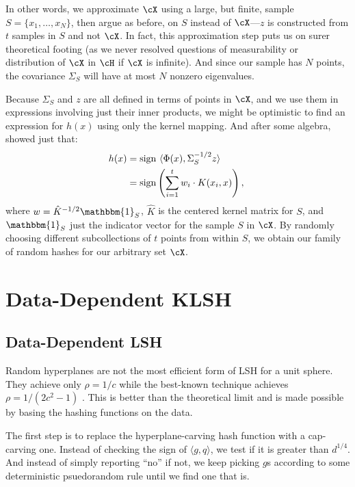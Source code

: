 \documentclass[twoside,11pt]{homework}
\begin{document}
\begin{multicols}{2}
In other words, we approximate $\cX$ using a large, but finite, sample $S = \{x_1,\dotsc, x_N\}$, then argue as before, on $S$ instead of $\cX$---$z$ is constructed from $t$ samples in $S$ and not $\cX$. In fact, this approximation step puts us on surer theoretical footing (as we never resolved questions of measurability or distribution of $\cX$ in $\cH$ if $\cX$ is infinite). And since our sample has $N$ points, the covariance $\Sigma_S$ will have at most $N$ nonzero eigenvalues.

Because $\Sigma_S$ and $z$ are all defined in terms of points in $\cX$, and we use them in expressions involving just their inner products, we might be optimistic to find an expression for $h(x)$ using only the kernel mapping. And after some algebra, \cite{K2012} showed just that:
\begin{align}
  h(x) &= \operatorname{sign} \ \langle \Phi(x), \Sigma_S^{-1/2} z\rangle \nonumber\\ 
  &= \operatorname{sign}\left(\sum_{i=1}^t w_i \cdot K(x_i, x)\right),\
\end{align}
where $w = \hat{K}^{-1/2}\mathbbm{1}_S$, $\hat{K}$ is the centered kernel matrix for $S$, and $\mathbbm{1}_S$ just the indicator vector for the sample $S$ in $\cX$. By randomly choosing different subcollections of $t$ points from within $S$, we obtain our family of random hashes for our arbitrary set $\cX$.


\section{Data-Dependent KLSH} %

\subsection{Data-Dependent LSH}

Random hyperplanes are not the most efficient form of LSH for a unit
sphere.  They achieve only $\rho=1/c$ while the best-known
technique achieves $\rho=1/(2c^2-1)$ \cite{AR15}.  This is better than the
theoretical limit and is made possible by basing the hashing functions
on the data.

The first step is to replace the hyperplane-carving hash function with
a cap-carving one.  Instead of checking the sign of $\langle g, q
\rangle$, we test if it is greater than $d^{1/4}$.  And
instead of simply reporting ``no'' if not, we keep picking $g$s
according to some deterministic psuedorandom rule until we find one
that is.


\end{multicols}
\end{document}
